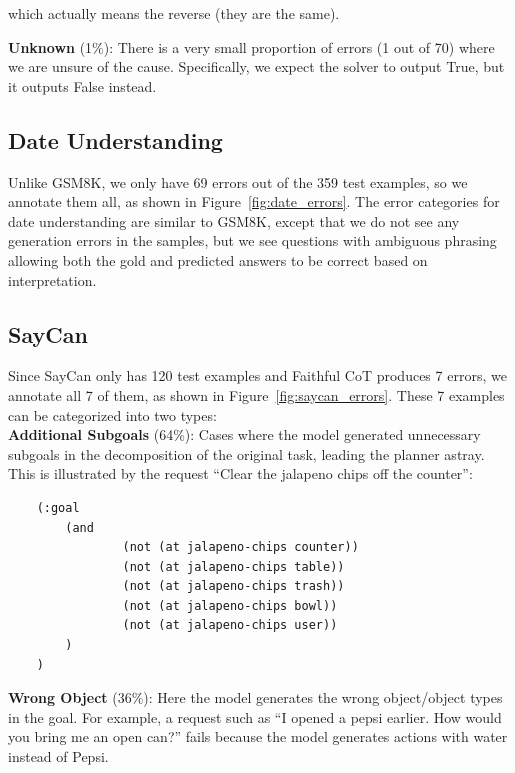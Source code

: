 \documentclass[11pt]{article}
\begin{document}
which actually means the reverse (they are the same).

\textbf{Unknown} (1\%): There is a very small proportion of errors (1 out of 70) where we are unsure of the cause. Specifically, we expect the solver to output True, but it outputs False instead.




\subsection{Date Understanding}
\label{sec:appendix_date_error_analysis}



Unlike GSM8K, we only have 69 errors out of the 359 test examples, so we annotate them all, as shown in Figure~\ref{fig:date_errors}. The error categories for date understanding are similar to GSM8K, except that we do not see any generation errors in the samples, but we see questions with ambiguous phrasing allowing both the gold and predicted answers to be correct based on interpretation. 


\subsection{SayCan}
\label{sec:appendix_saycan_error_analysis}



Since SayCan only has 120 test examples and Faithful CoT produces 7 errors, we annotate all 7 of them, as shown in Figure~\ref{fig:saycan_errors}. These 7 examples can be categorized into two types:\\
\textbf{Additional Subgoals} (64\%): Cases where the model generated unnecessary subgoals in the decomposition of the original task, leading the planner astray. This is illustrated by the request ``Clear the jalapeno chips off the counter'':

\begin{small}
\begin{verbatim}
    (:goal
        (and
                (not (at jalapeno-chips counter))
                (not (at jalapeno-chips table))
                (not (at jalapeno-chips trash))
                (not (at jalapeno-chips bowl))
                (not (at jalapeno-chips user))
        )
    )
\end{verbatim}
\end{small}

\textbf{Wrong Object} (36\%): Here the model generates the wrong object/object types in the goal. For example, a request such as ``I opened a pepsi earlier. How would you bring me an open can?'' fails because the model generates actions with water instead of Pepsi.
\end{document}
